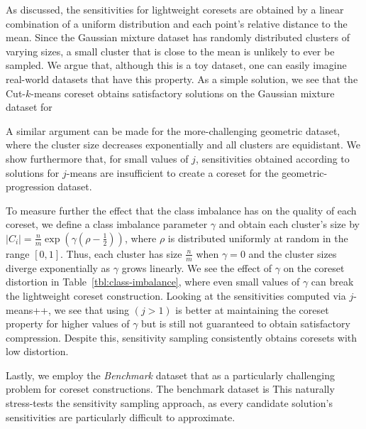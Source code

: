 As discussed, the sensitivities for lightweight coresets are obtained by a linear combination of a uniform distribution and each point's relative
distance to the mean. Since the Gaussian mixture dataset has randomly distributed clusters of varying sizes, a small cluster that is close to the mean is unlikely
to ever be sampled. We argue that, although this is a toy dataset, one can easily imagine real-world datasets that have this property. 
As a simple solution, we see
that the Cut-$k$-means coreset obtains satisfactory solutions on the Gaussian mixture dataset for 

A similar argument can be made for the more-challenging geometric dataset, where the cluster size decreases exponentially and all clusters are equidistant.
We show furthermore that, for small values of $j$, sensitivities obtained according to
solutions for $j$-means are insufficient to create a coreset for the geometric-progression dataset.

To measure further the effect that the class imbalance has on the quality of each coreset, we define a class imbalance parameter $\gamma$ and obtain each
cluster's size by $|C_i| = \frac{n}{m} \exp \left( \gamma(\rho - \frac{1}{2}) \right)$, where $\rho$ is distributed uniformly at random in the range $[0, 1]$. 
Thus, each cluster has size $\frac{n}{m}$ when $\gamma = 0$ and the cluster sizes diverge exponentially as $\gamma$ grows linearly. We see the effect of $\gamma$ on the coreset
distortion in Table~\ref{tbl:class-imbalance}, where even small values of $\gamma$ can break the lightweight coreset construction.
 Looking at the
sensitivities computed via $j$-means++, we see that using $(j>1)$ is better at maintaining the coreset property for higher values of $\gamma$ but is still not guaranteed
to obtain satisfactory compression. Despite this, sensitivity sampling consistently obtains coresets with low distortion. 

Lastly, we employ the \emph{Benchmark} dataset that  as a particularly challenging problem for coreset constructions.  The
benchmark dataset is  This naturally stress-tests
the sensitivity sampling approach, as every candidate solution's sensitivities are particularly difficult to approximate. 




